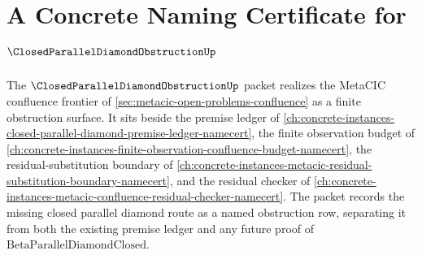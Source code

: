 \chapter{A Concrete Naming Certificate for $\ClosedParallelDiamondObstructionUp$}
\label{ch:concrete-instances-closed-parallel-diamond-obstruction-namecert}

The $\ClosedParallelDiamondObstructionUp$ packet realizes the MetaCIC confluence frontier of \autoref{sec:metacic-open-problems-confluence} as a finite obstruction surface. It sits beside the premise ledger of \autoref{ch:concrete-instances-closed-parallel-diamond-premise-ledger-namecert}, the finite observation budget of \autoref{ch:concrete-instances-finite-observation-confluence-budget-namecert}, the residual-substitution boundary of \autoref{ch:concrete-instances-metacic-residual-substitution-boundary-namecert}, and the residual checker of \autoref{ch:concrete-instances-metacic-confluence-residual-checker-namecert}. The packet records the missing closed parallel diamond route as a named obstruction row, separating it from both the existing premise ledger and any future proof of $\mathrm{BetaParallelDiamondClosed}$.

